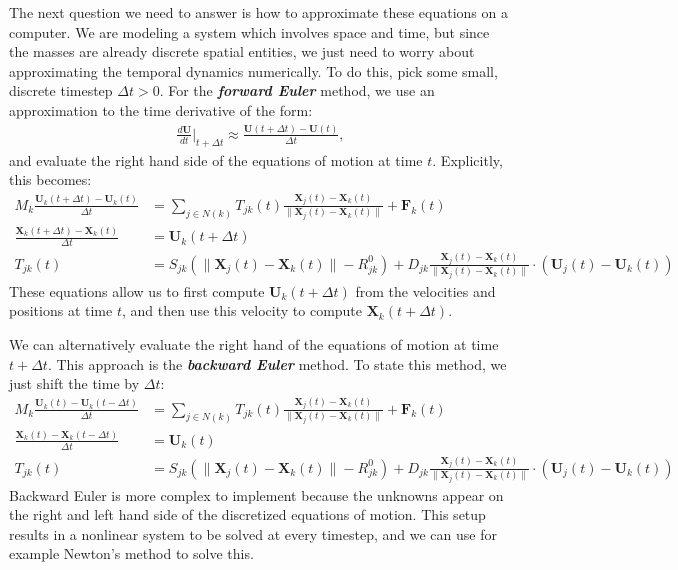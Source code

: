 \documentclass[10pt]{article}
\newcommand{\bs}[1]{{\boldsymbol #1}}
\begin{document}
The next question we need to answer is how to approximate these equations on a computer.  We are modeling a system which involves space and time, but since the masses are already discrete spatial entities, we just need to worry about approximating the temporal dynamics numerically.  To do this, pick some small, discrete timestep $\Delta t > 0$.  For the {\bf \em forward Euler} method, we use an approximation to the time derivative of the form:
\begin{align*}
\frac{d {\bs U}}{dt}\Big|_{t + \Delta t} \approx \frac{{\bs U}(t+\Delta t ) - {\bs U}(t)}{\Delta t},
\end{align*}
and evaluate the right hand side of the equations of motion at time $t$.  Explicitly, this becomes:
\begin{align*}
M_k \frac{{\bs U}_k(t + \Delta t) - {\bs U}_k(t)}{\Delta t} &= \sum_{j \in N(k)} T_{jk}(t) \frac{{\bs X}_j(t) - {\bs X}_k(t)}{\| {\bs X}_j(t) - {\bs X}_k(t) \|} + {\bs F}_k(t) \\
\frac{{\bs X}_k(t + \Delta t) - {\bs X}_k(t)}{\Delta t} &= {\bs U}_k(t + \Delta t) \\
T_{jk}(t) &= S_{jk} \left( \|{\bs X}_j(t) - {\bs X}_k(t)\| - R^0_{jk} \right) + D_{jk} \frac{{\bs X}_j(t) - {\bs X}_k(t)}{\|{\bs X}_j(t) - {\bs X}_k(t)\|} \cdot ({\bs U}_j(t) - {\bs U}_k(t))
\end{align*}
These equations allow us to first compute ${\bs U}_k(t + \Delta t)$ from the velocities and positions at time $t$, and then use this velocity to compute ${\bs X}_k(t + \Delta t)$. 

We can alternatively evaluate the right hand of the equations of motion at time $t + \Delta t$.  This approach is the {\bf \em backward Euler} method.  To state this method, we just shift the time by $\Delta t$:
\begin{align*}
M_k \frac{{\bs U}_k(t) - {\bs U}_k(t- \Delta t)}{\Delta t} &= \sum_{j \in N(k)} T_{jk}(t) \frac{{\bs X}_j(t) - {\bs X}_k(t)}{\| {\bs X}_j(t) - {\bs X}_k(t) \|} + {\bs F}_k(t)\\
\frac{{\bs X}_k(t) - {\bs X}_k(t - \Delta t)}{\Delta t} &= {\bs U}_k(t) \\
T_{jk}(t) &= S_{jk} \left( \|{\bs X}_j(t) - {\bs X}_k(t)\| - R^0_{jk} \right) + D_{jk} \frac{{\bs X}_j(t) - {\bs X}_k(t)}{\|{\bs X}_j(t) - {\bs X}_k(t)\|} \cdot ({\bs U}_j(t) - {\bs U}_k(t))
\end{align*}
Backward Euler is more complex to implement because the unknowns appear on the right and left hand side of the discretized equations of motion.  This setup results in a nonlinear system to be solved at every timestep, and we can use for example Newton's method to solve this.
\end{document}
